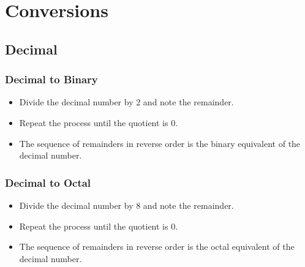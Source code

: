 \documentclass[12pt letter]{report}
\begin{document}
\chapter{Conversions}

\section{Decimal}

\subsection{Decimal to Binary}
\begin{itemize}
  \item Divide the decimal number by 2 and note the remainder.
  \item Repeat the process until the quotient is 0.
  \item The sequence of remainders in reverse order is the binary equivalent of the decimal number.
\end{itemize}


\subsection{Decimal to Octal}

\begin{itemize}
  \item Divide the decimal number by 8 and note the remainder.
  \item Repeat the process until the quotient is 0.
  \item The sequence of remainders in reverse order is the octal equivalent of the decimal number.
\end{itemize}
\end{document}
